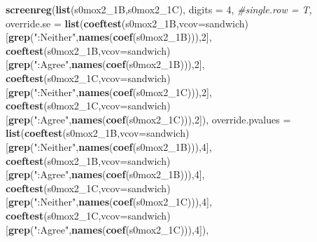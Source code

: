 \documentclass[
]{article}
\newenvironment{Shaded}{\begin{snugshade}}{\end{snugshade}}
\newcommand{\CommentTok}[1]{\textcolor[rgb]{0.56,0.35,0.01}{\textit{#1}}}
\newcommand{\DataTypeTok}[1]{\textcolor[rgb]{0.13,0.29,0.53}{#1}}
\newcommand{\DecValTok}[1]{\textcolor[rgb]{0.00,0.00,0.81}{#1}}
\newcommand{\KeywordTok}[1]{\textcolor[rgb]{0.13,0.29,0.53}{\textbf{#1}}}
\newcommand{\NormalTok}[1]{#1}
\newcommand{\StringTok}[1]{\textcolor[rgb]{0.31,0.60,0.02}{#1}}
\begin{document}
\begin{Shaded}
\begin{Highlighting}[]
\KeywordTok{screenreg}\NormalTok{(}\KeywordTok{list}\NormalTok{(s0mox2_1B,s0mox2_1C), }\DataTypeTok{digits =} \DecValTok{4}\NormalTok{, }\CommentTok{#single.row = T,}
          \DataTypeTok{override.se =} \KeywordTok{list}\NormalTok{(}\KeywordTok{coeftest}\NormalTok{(s0mox2_1B,}\DataTypeTok{vcov=}\NormalTok{sandwich)[}\KeywordTok{grep}\NormalTok{(}\StringTok{":Neither"}\NormalTok{,}\KeywordTok{names}\NormalTok{(}\KeywordTok{coef}\NormalTok{(s0mox2_1B))),}\DecValTok{2}\NormalTok{],}
                             \KeywordTok{coeftest}\NormalTok{(s0mox2_1B,}\DataTypeTok{vcov=}\NormalTok{sandwich)[}\KeywordTok{grep}\NormalTok{(}\StringTok{":Agree"}\NormalTok{,}\KeywordTok{names}\NormalTok{(}\KeywordTok{coef}\NormalTok{(s0mox2_1B))),}\DecValTok{2}\NormalTok{],}
                             \KeywordTok{coeftest}\NormalTok{(s0mox2_1C,}\DataTypeTok{vcov=}\NormalTok{sandwich)[}\KeywordTok{grep}\NormalTok{(}\StringTok{":Neither"}\NormalTok{,}\KeywordTok{names}\NormalTok{(}\KeywordTok{coef}\NormalTok{(s0mox2_1C))),}\DecValTok{2}\NormalTok{],}
                             \KeywordTok{coeftest}\NormalTok{(s0mox2_1C,}\DataTypeTok{vcov=}\NormalTok{sandwich)[}\KeywordTok{grep}\NormalTok{(}\StringTok{":Agree"}\NormalTok{,}\KeywordTok{names}\NormalTok{(}\KeywordTok{coef}\NormalTok{(s0mox2_1C))),}\DecValTok{2}\NormalTok{]),}
          \DataTypeTok{override.pvalues =} \KeywordTok{list}\NormalTok{(}\KeywordTok{coeftest}\NormalTok{(s0mox2_1B,}\DataTypeTok{vcov=}\NormalTok{sandwich)[}\KeywordTok{grep}\NormalTok{(}\StringTok{":Neither"}\NormalTok{,}\KeywordTok{names}\NormalTok{(}\KeywordTok{coef}\NormalTok{(s0mox2_1B))),}\DecValTok{4}\NormalTok{],}
                                  \KeywordTok{coeftest}\NormalTok{(s0mox2_1B,}\DataTypeTok{vcov=}\NormalTok{sandwich)[}\KeywordTok{grep}\NormalTok{(}\StringTok{":Agree"}\NormalTok{,}\KeywordTok{names}\NormalTok{(}\KeywordTok{coef}\NormalTok{(s0mox2_1B))),}\DecValTok{4}\NormalTok{],}
                                  \KeywordTok{coeftest}\NormalTok{(s0mox2_1C,}\DataTypeTok{vcov=}\NormalTok{sandwich)[}\KeywordTok{grep}\NormalTok{(}\StringTok{":Neither"}\NormalTok{,}\KeywordTok{names}\NormalTok{(}\KeywordTok{coef}\NormalTok{(s0mox2_1C))),}\DecValTok{4}\NormalTok{],}
                                  \KeywordTok{coeftest}\NormalTok{(s0mox2_1C,}\DataTypeTok{vcov=}\NormalTok{sandwich)[}\KeywordTok{grep}\NormalTok{(}\StringTok{":Agree"}\NormalTok{,}\KeywordTok{names}\NormalTok{(}\KeywordTok{coef}\NormalTok{(s0mox2_1C))),}\DecValTok{4}\NormalTok{]),}

\end{Highlighting}
\end{Shaded}
\end{document}
